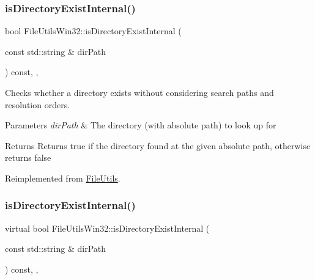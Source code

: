 \mbox{\label{classFileUtilsWin32_a9a408c75230da1289e5619285dd00f67}} 
\subsubsection{\texorpdfstring{is\+Directory\+Exist\+Internal()}{isDirectoryExistInternal()}\hspace{0.1cm}{\footnotesize\ttfamily [1/2]}}
{\footnotesize\ttfamily bool File\+Utils\+Win32\+::is\+Directory\+Exist\+Internal (\begin{DoxyParamCaption}\item[{const std\+::string \&}]{dir\+Path }\end{DoxyParamCaption}) const\hspace{0.3cm}{\ttfamily [override]}, {\ttfamily [protected]}, {\ttfamily [virtual]}}

Checks whether a directory exists without considering search paths and resolution orders. 
\begin{DoxyParams}{Parameters}
{\em dir\+Path} & The directory (with absolute path) to look up for \\
\hline
\end{DoxyParams}
\begin{DoxyReturn}{Returns}
Returns true if the directory found at the given absolute path, otherwise returns false 
\end{DoxyReturn}


Reimplemented from \hyperlink{classFileUtils_a6f2a350e8f2b15219637b40bed4c38ec}{File\+Utils}.

\mbox{\label{classFileUtilsWin32_aaeab26cde3a9a4cf3e4f8367d20f0e08}} 
\subsubsection{\texorpdfstring{is\+Directory\+Exist\+Internal()}{isDirectoryExistInternal()}\hspace{0.1cm}{\footnotesize\ttfamily [2/2]}}
{\footnotesize\ttfamily virtual bool File\+Utils\+Win32\+::is\+Directory\+Exist\+Internal (\begin{DoxyParamCaption}\item[{const std\+::string \&}]{dir\+Path }\end{DoxyParamCaption}) const\hspace{0.3cm}{\ttfamily [override]}, {\ttfamily [protected]}, {\ttfamily [virtual]}}

